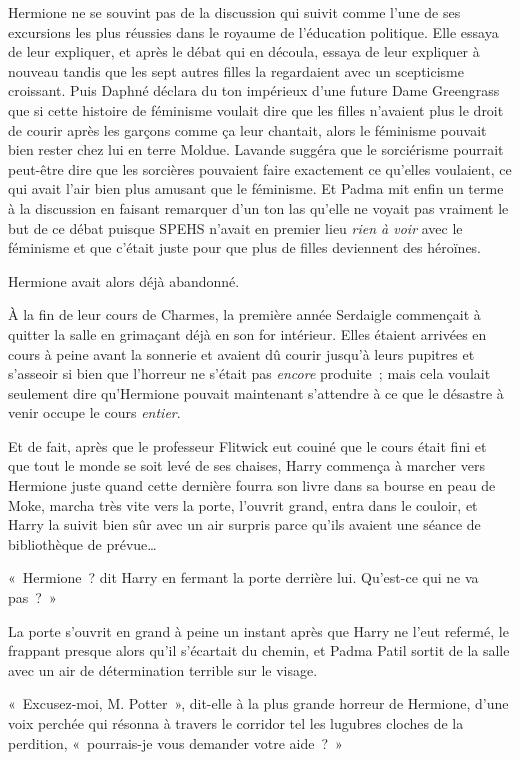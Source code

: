 Hermione ne se souvint pas de la discussion qui suivit comme l'une de ses excursions les plus réussies dans le royaume de l'éducation politique.
Elle essaya de leur expliquer, et après le débat qui en découla, essaya de leur expliquer à nouveau tandis que les sept autres filles la regardaient avec un scepticisme croissant.
Puis Daphné déclara du ton impérieux d'une future Dame Greengrass que si cette histoire de féminisme voulait dire que les filles n'avaient plus le droit de courir après les garçons comme ça leur chantait, alors le féminisme pouvait bien rester chez lui en terre Moldue.
Lavande suggéra que le sorciérisme pourrait peut-être dire que les sorcières pouvaient faire exactement ce qu'elles voulaient, ce qui avait l'air bien plus amusant que le féminisme.
Et Padma mit enfin un terme à la discussion en faisant remarquer d'un ton las qu'elle ne voyait pas vraiment le but de ce débat puisque SPEHS n'avait en premier lieu \emph{rien à voir} avec le féminisme et que c'était juste pour que plus de filles deviennent des héroïnes.

Hermione avait alors déjà abandonné.

\later

À la fin de leur cours de Charmes, la première année Serdaigle commençait à quitter la salle en grimaçant déjà en son for intérieur.
Elles étaient arrivées en cours à peine avant la sonnerie et avaient dû courir jusqu'à leurs pupitres et s'asseoir si bien que l'horreur ne s'était pas \emph{encore} produite~; mais cela voulait seulement dire qu'Hermione pouvait maintenant s'attendre à ce que le désastre à venir occupe le cours \emph{entier}.

Et de fait, après que le professeur Flitwick eut couiné que le cours était fini et que tout le monde se soit levé de ses chaises, Harry commença à marcher vers Hermione juste quand cette dernière fourra son livre dans sa bourse en peau de Moke, marcha très vite vers la porte, l'ouvrit grand, entra dans le couloir, et Harry la suivit bien sûr avec un air surpris parce qu'ils avaient une séance de bibliothèque de prévue…

«~Hermione~? dit Harry en fermant la porte derrière lui.
Qu'est-ce qui ne va pas~?~»

La porte s'ouvrit en grand à peine un instant après que Harry ne l'eut refermé, le frappant presque alors qu'il s'écartait du chemin, et Padma Patil sortit de la salle avec un air de détermination terrible sur le visage.

«~Excusez-moi, M. Potter~», dit-elle à la plus grande horreur de Hermione, d'une voix perchée qui résonna à travers le corridor tel les lugubres cloches de la perdition, «~pourrais-je vous demander votre aide~?~»

